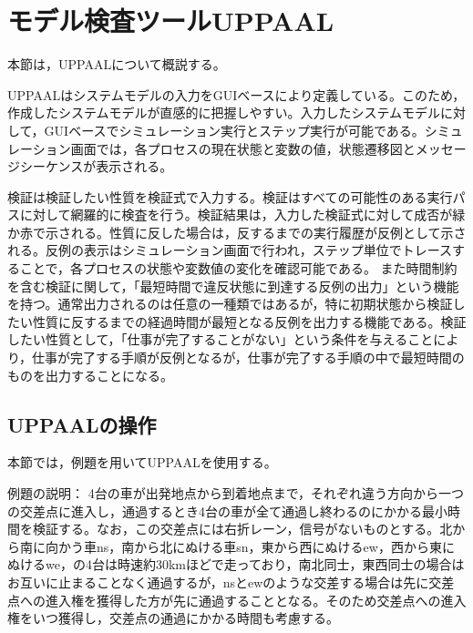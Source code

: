 \documentclass{tpu-sotu}
\begin{document}
	\section{モデル検査ツールUPPAAL}
	本節は，UPPAALについて概説する。
	
	UPPAALはシステムモデルの入力をGUIベースにより定義している。このため，作成したシステムモデルが直感的に把握しやすい。入力したシステムモデルに対して，GUIベースでシミュレーション実行とステップ実行が可能である。シミュレーション画面では，各プロセスの現在状態と変数の値，状態遷移図とメッセージシーケンスが表示される。
	
	検証は検証したい性質を検証式で入力する。検証はすべての可能性のある実行パスに対して網羅的に検査を行う。検証結果は，入力した検証式に対して成否が緑か赤で示される。性質に反した場合は，反するまでの実行履歴が反例として示される。反例の表示はシミュレーション画面で行われ，ステップ単位でトレースすることで，各プロセスの状態や変数値の変化を確認可能である。
	また時間制約を含む検証に関して，「最短時間で違反状態に到達する反例の出力」という機能を持つ。通常出力されるのは任意の一種類ではあるが，特に初期状態から検証したい性質に反するまでの経過時間が最短となる反例を出力する機能である。検証したい性質として，「仕事が完了することがない」という条件を与えることにより，仕事が完了する手順が反例となるが，仕事が完了する手順の中で最短時間のものを出力することになる。
	\subsection{UPPAALの操作}
	本節では，例題を用いてUPPAALを使用する。
	
	例題の説明：
	4台の車が出発地点から到着地点まで，それぞれ違う方向から一つの交差点に進入し，通過するとき4台の車が全て通過し終わるのにかかる最小時間を検証する。なお，この交差点には右折レーン，信号がないものとする。北から南に向かう車ns，南から北にぬける車sn，東から西にぬけるew，西から東にぬけるwe，の4台は時速約30kmほどで走っており，南北同士，東西同士の場合はお互いに止まることなく通過するが，nsとewのような交差する場合は先に交差点への進入権を獲得した方が先に通過することとなる。そのため交差点への進入権をいつ獲得し，交差点の通過にかかる時間も考慮する。
	
\end{document}
